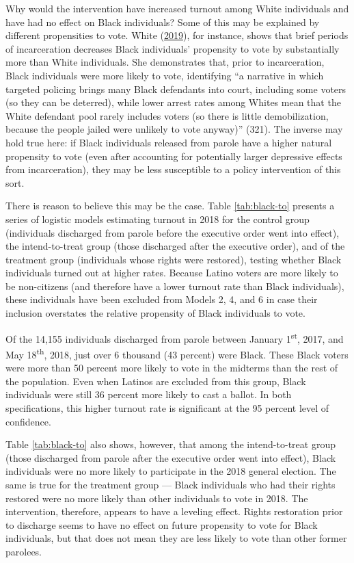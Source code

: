 \documentclass[12pt,]{article}
\begin{document}
Why would the intervention have increased turnout among White individuals and have had no effect on Black individuals? Some of this may be explained by different propensities to vote. White (\protect\hyperlink{ref-White2019}{2019}), for instance, shows that brief periods of incarceration decreases Black individuals' propensity to vote by substantially more than White individuals. She demonstrates that, prior to incarceration, Black individuals were more likely to vote, identifying ``a narrative in which targeted policing brings many Black defendants into court, including some voters (so they can be deterred), while lower arrest rates among Whites mean that the White defendant pool rarely includes voters (so there is little demobilization, because the people jailed were unlikely to vote anyway)'' (321). The inverse may hold true here: if Black individuals released from parole have a higher natural propensity to vote (even after accounting for potentially larger depressive effects from incarceration), they may be less susceptible to a policy intervention of this sort.

There is reason to believe this may be the case. Table \ref{tab:black-to} presents a series of logistic models estimating turnout in 2018 for the control group (individuals discharged from parole before the executive order went into effect), the intend-to-treat group (those discharged after the executive order), and of the treatment group (individuals whose rights were restored), testing whether Black individuals turned out at higher rates. Because Latino voters are more likely to be non-citizens (and therefore have a lower turnout rate than Black individuals), these individuals have been excluded from Models 2, 4, and 6 in case their inclusion overstates the relative propensity of Black individuals to vote.



Of the 14,155 individuals discharged from parole between January 1\textsuperscript{st}, 2017, and May 18\textsuperscript{th}, 2018, just over 6 thousand (43 percent) were Black. These Black voters were more than 50 percent more likely to vote in the midterms than the rest of the population. Even when Latinos are excluded from this group, Black individuals were still 36 percent more likely to cast a ballot. In both specifications, this higher turnout rate is significant at the 95 percent level of confidence.

Table \ref{tab:black-to} also shows, however, that among the intend-to-treat group (those discharged from parole after the executive order went into effect), Black individuals were no more likely to participate in the 2018 general election. The same is true for the treatment group --- Black individuals who had their rights restored were no more likely than other individuals to vote in 2018. The intervention, therefore, appears to have a leveling effect. Rights restoration prior to discharge seems to have no effect on future propensity to vote for Black individuals, but that does not mean they are less likely to vote than other former parolees.
\end{document}
